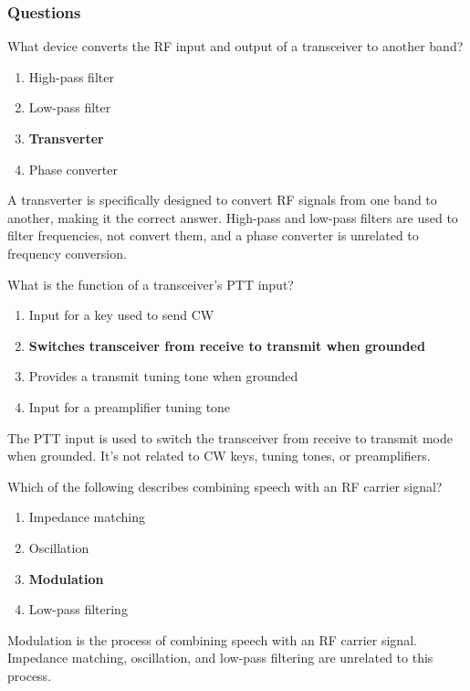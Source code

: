 \subsubsection{Questions}
\begin{tcolorbox}[colback=gray!10!white,colframe=black!75!black,title={T7A06}]
    What device converts the RF input and output of a transceiver to another band?
    \begin{enumerate}[label=\Alph*),noitemsep]
        \item High-pass filter
        \item Low-pass filter
        \item \textbf{Transverter}
        \item Phase converter
    \end{enumerate}
\end{tcolorbox}
A transverter is specifically designed to convert RF signals from one band to another, making it the correct answer. High-pass and low-pass filters are used to filter frequencies, not convert them, and a phase converter is unrelated to frequency conversion.

\begin{tcolorbox}[colback=gray!10!white,colframe=black!75!black,title={T7A07}]
    What is the function of a transceiver’s PTT input?
    \begin{enumerate}[label=\Alph*),noitemsep]
        \item Input for a key used to send CW
        \item \textbf{Switches transceiver from receive to transmit when grounded}
        \item Provides a transmit tuning tone when grounded
        \item Input for a preamplifier tuning tone
    \end{enumerate}
\end{tcolorbox}
The PTT input is used to switch the transceiver from receive to transmit mode when grounded. It’s not related to CW keys, tuning tones, or preamplifiers.

\begin{tcolorbox}[colback=gray!10!white,colframe=black!75!black,title={T7A08}]
    Which of the following describes combining speech with an RF carrier signal?
    \begin{enumerate}[label=\Alph*),noitemsep]
        \item Impedance matching
        \item Oscillation
        \item \textbf{Modulation}
        \item Low-pass filtering
    \end{enumerate}
\end{tcolorbox}
Modulation is the process of combining speech with an RF carrier signal. Impedance matching, oscillation, and low-pass filtering are unrelated to this process.
